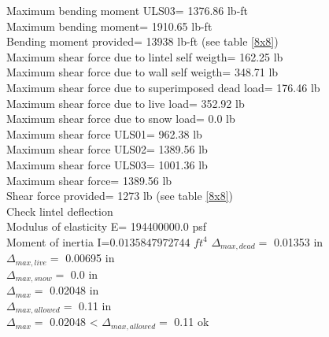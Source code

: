 Maximum bending moment ULS03=  1376.86 lb-ft \\
Maximum bending moment=  1910.65 lb-ft \\
Bending moment provided= 13938 lb-ft (see table \ref{8x8}) \\
Maximum shear force due to lintel self weigth=  162.25 lb \\
Maximum shear force due to wall self weigth=  348.71 lb \\
Maximum shear force due to superimposed dead load=  176.46 lb \\
Maximum shear force due to live load=  352.92 lb \\
Maximum shear force due to snow load=  0.0 lb \\
Maximum shear force ULS01=  962.38 lb \\
Maximum shear force ULS02=  1389.56 lb \\
Maximum shear force ULS03=  1001.36 lb \\
Maximum shear force=  1389.56 lb \\
Shear force provided= 1273 lb (see table \ref{8x8}) \\
Check lintel deflection \\
Modulus of elasticity E=  194400000.0  psf \\
Moment of inertia I=$  0.0135847972744$  $ft^4 $
$\Delta_{max,dead} =$  0.01353  in \\
$\Delta_{max,live} =$  0.00695  in \\
$\Delta_{max,snow} =$  0.0  in \\
$\Delta_{max} =$  0.02048  in \\
$\Delta_{max,allowed} =$  0.11  in \\
$\Delta_{max} =$  0.02048  < $\Delta_{max,allowed} =$  0.11  ok \\

